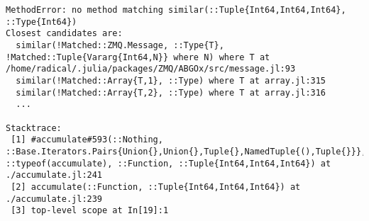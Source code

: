 \documentclass[11pt]{article}
\begin{document}
\begin{verbatim}
MethodError: no method matching similar(::Tuple{Int64,Int64,Int64}, ::Type{Int64})
Closest candidates are:
  similar(!Matched::ZMQ.Message, ::Type{T}, !Matched::Tuple{Vararg{Int64,N}} where N) where T at /home/radical/.julia/packages/ZMQ/ABGOx/src/message.jl:93
  similar(!Matched::Array{T,1}, ::Type) where T at array.jl:315
  similar(!Matched::Array{T,2}, ::Type) where T at array.jl:316
  ...

Stacktrace:
 [1] #accumulate#593(::Nothing, ::Base.Iterators.Pairs{Union{},Union{},Tuple{},NamedTuple{(),Tuple{}}}, ::typeof(accumulate), ::Function, ::Tuple{Int64,Int64,Int64}) at ./accumulate.jl:241
 [2] accumulate(::Function, ::Tuple{Int64,Int64,Int64}) at ./accumulate.jl:239
 [3] top-level scope at In[19]:1
\end{verbatim}
\end{document}
